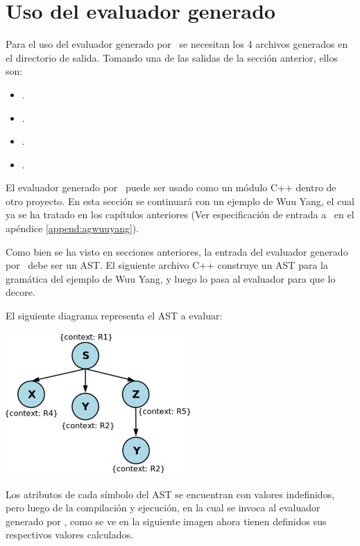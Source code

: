 \section{Uso del evaluador generado}

Para el uso del evaluador generado por \maggen\ se necesitan los 4 archivos generados en el directorio de salida. Tomando una de las salidas de la sección anterior, ellos son:
\begin{itemize}
\item {}.
\item {}.
\item {}.
\item {}.
\end{itemize}

El evaluador generado por \maggen\ puede ser usado como un módulo C++ dentro de otro proyecto. En esta sección se continuará con un ejemplo de Wuu Yang, el cual ya se ha tratado en los capítulos anteriores (Ver especificación de entrada a \maggen\ en el apéndice \ref{append:agwuuyang}).

Como bien se ha visto en secciones anteriores, la entrada del evaluador generado por \maggen\ debe ser un AST. El siguiente archivo C++ construye un AST para la gramática del ejemplo de Wuu Yang, y luego lo pasa al evaluador para que lo decore.



El siguiente diagrama representa el AST a evaluar:

\begin{center}
\includegraphics[width=200pt,height=154pt]{ast.png}
\end{center}

Los atributos de cada símbolo del AST se encuentran con valores indefinidos, pero luego de la compilación y ejecución, en la cual se invoca al evaluador generado por \maggen, como se ve en la siguiente imagen ahora tienen definidos sus respectivos valores calculados.

